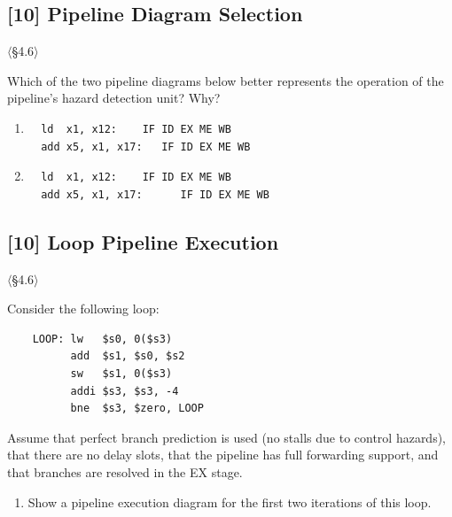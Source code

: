 \problembreak

\subsection{[10] Pipeline Diagram Selection}
\hypertarget{prob-4.24}{}
\noindent$\langle$\S4.6$\rangle$\medskip

\noindent Which of the two pipeline diagrams below better represents the
operation of the pipeline's hazard detection unit? Why?

\begin{enumerate}
  \item[a.]
\begin{verbatim}
  ld  x1, x12:    IF ID EX ME WB
  add x5, x1, x17:   IF ID EX ME WB
\end{verbatim}

  \item[b.]
\begin{verbatim}
  ld  x1, x12:    IF ID EX ME WB
  add x5, x1, x17:      IF ID EX ME WB
\end{verbatim}
\end{enumerate}

\problembreak

\subsection{[10] Loop Pipeline Execution}
\hypertarget{prob-4.25}{}
\noindent$\langle$\S4.6$\rangle$\medskip

\noindent Consider the following loop:
\begin{verbatim}
    LOOP: lw   $s0, 0($s3)
          add  $s1, $s0, $s2
          sw   $s1, 0($s3)
          addi $s3, $s3, -4
          bne  $s3, $zero, LOOP
\end{verbatim}

\noindent Assume that perfect branch prediction is used (no stalls due to
control hazards), that there are no delay slots, that the pipeline has full
forwarding support, and that branches are resolved in the EX stage.

\begin{enumerate}
  \item[4.25.1] [10] Show a pipeline execution diagram for the first two
        iterations of this loop.
\end{enumerate}

